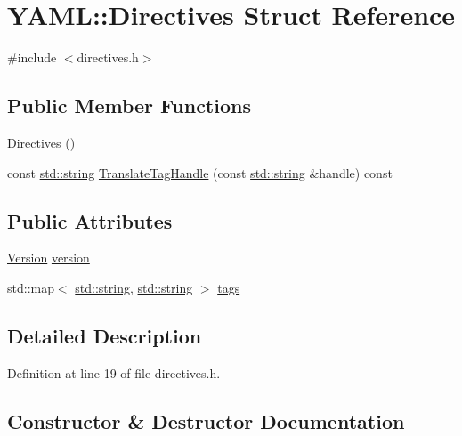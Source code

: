 \hypertarget{struct_y_a_m_l_1_1_directives}{}\section{Y\+A\+ML\+::Directives Struct Reference}
\label{struct_y_a_m_l_1_1_directives}


{\ttfamily \#include $<$directives.\+h$>$}

\subsection*{Public Member Functions}
\begin{DoxyCompactItemize}
\item 
\mbox{\hyperlink{struct_y_a_m_l_1_1_directives_ac8f3d850aeb49caaf4d4c99aa3768acd}{Directives}} ()
\item 
const \mbox{\hyperlink{glad_8h_ac83513893df92266f79a515488701770}{std\+::string}} \mbox{\hyperlink{struct_y_a_m_l_1_1_directives_a75840e90c987368715c5cdf8703efc46}{Translate\+Tag\+Handle}} (const \mbox{\hyperlink{glad_8h_ac83513893df92266f79a515488701770}{std\+::string}} \&handle) const
\end{DoxyCompactItemize}
\subsection*{Public Attributes}
\begin{DoxyCompactItemize}
\item 
\mbox{\hyperlink{struct_y_a_m_l_1_1_version}{Version}} \mbox{\hyperlink{struct_y_a_m_l_1_1_directives_a15d6b1ed53add761d81599654a9ea35a}{version}}
\item 
std\+::map$<$ \mbox{\hyperlink{glad_8h_ac83513893df92266f79a515488701770}{std\+::string}}, \mbox{\hyperlink{glad_8h_ac83513893df92266f79a515488701770}{std\+::string}} $>$ \mbox{\hyperlink{struct_y_a_m_l_1_1_directives_a0dcffe42d032bc3e2f99a417811b6bde}{tags}}
\end{DoxyCompactItemize}


\subsection{Detailed Description}


Definition at line 19 of file directives.\+h.



\subsection{Constructor \& Destructor Documentation}
\mbox{\label{struct_y_a_m_l_1_1_directives_ac8f3d850aeb49caaf4d4c99aa3768acd}} 
